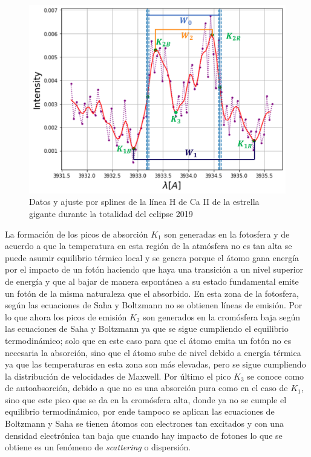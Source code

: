 \documentclass[12pt,oneside,openany,letter]{book}
\begin{document}
\begin{figure}[h]
    \centering
    \includegraphics[width=0.8\linewidth]{Images/lineaCaii.png}
    \caption{Datos y ajuste por splines de la línea H de Ca II de la estrella gigante durante la totalidad del eclipse 2019}
    \label{fig:lineaCaii}
\end{figure}

\noindent La formación de los picos de absorción $K_1$ son generadas en la fotosfera y de acuerdo a que la temperatura en esta región de la atmósfera no es tan alta se puede asumir equilibrio térmico local y se genera porque el átomo gana energía por el impacto de un fotón haciendo que haya una transición a un nivel superior de energía y que al bajar de manera espontánea a su estado fundamental emite un fotón de la misma naturaleza que el absorbido. En esta zona de la fotosfera, según las ecuaciones de Saha y Boltzmann no se obtienen líneas de emisión. Por lo que ahora los picos de emisión $K_2$ son generados en la cromósfera baja según las ecuaciones de Saha y Boltzmann ya que se sigue cumpliendo el equilibrio termodinámico; solo que en este caso para que el átomo emita un fotón no es necesaria la absorción, sino que el átomo sube de nivel debido a energía térmica ya que las temperaturas en esta zona son más elevadas, pero se sigue cumpliendo la distribución de velocidades de Maxwell. Por último el pico $K_3$ se conoce como de autoabsorción, debido a que no es una absorción pura como en el caso de $K_1$, sino que este pico que se da en la cromósfera alta, donde ya no se cumple el equilibrio termodinámico, por ende tampoco se aplican las ecuaciones de Boltzmann y Saha se tienen átomos con electrones tan excitados y con una densidad electrónica tan baja que cuando hay impacto de fotones lo que se obtiene es un fenómeno de \textit{scattering} o dispersión.
\end{document}
